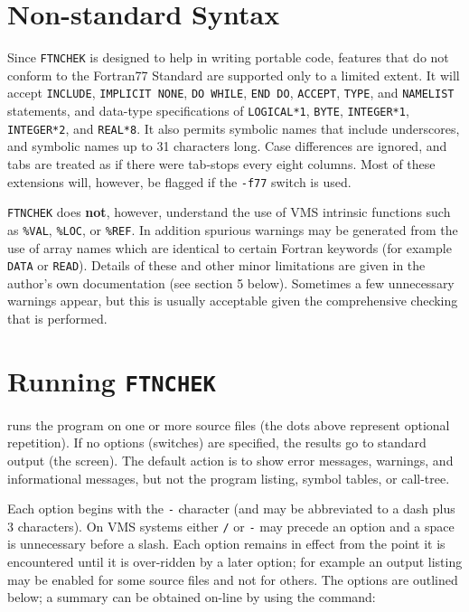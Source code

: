 \documentclass[twoside,11pt,nolof]{starlink}
\begin{document}
\section{Non-standard Syntax}

Since \texttt{FTNCHEK} is designed to help in writing portable code,
features that do not conform to the Fortran77 Standard are supported
only to a limited extent.  It will accept \texttt{INCLUDE}, \texttt{IMPLICIT
NONE}, \texttt{DO WHILE}, \texttt{END DO}, \texttt{ACCEPT}, \texttt{TYPE}, and \texttt{NAMELIST} statements, and data-type specifications of \texttt{LOGICAL*1},
\texttt{BYTE}, \texttt{INTEGER*1}, \texttt{INTEGER*2}, and \texttt{REAL*8}.  It also
permits symbolic names that include underscores, and symbolic names up
to 31 characters long. Case differences are ignored, and tabs are
treated as if there were tab-stops every eight columns.  Most of these
extensions will, however, be flagged if the \texttt{-f77} switch is used.

\texttt{FTNCHEK} does \textbf{not}, however, understand the use of VMS
intrinsic functions such as \texttt{\%VAL}, \texttt{\%LOC}, or \texttt{\%REF}. In
addition spurious warnings may be generated from the use of array names
which are identical to certain Fortran keywords (for example \texttt{DATA}
or \texttt{READ}).  Details of these and other minor limitations are given
in the author's own documentation (see section 5 below).  Sometimes a
few unnecessary warnings appear, but this is usually acceptable given
the comprehensive checking that is performed.

\section{Running \texttt{FTNCHEK}}


runs the program on one or more source files (the dots above represent
optional repetition). If no options (switches) are specified, the
results go to standard output (the screen).  The default action is to
show error messages, warnings, and informational messages, but not the
program listing, symbol tables, or call-tree.

Each option begins with the \texttt{-} character (and may be abbreviated to
a dash plus 3 characters).  On VMS systems either \texttt{/} or \texttt{-}
may precede an option and a space is unnecessary before a slash. Each
option remains in effect from the point it is encountered until it is
over-ridden by a later option; for example an output listing may be
enabled for some source files and not for others. The options are
outlined below; a summary can be obtained on-line by using the command:
\end{document}
